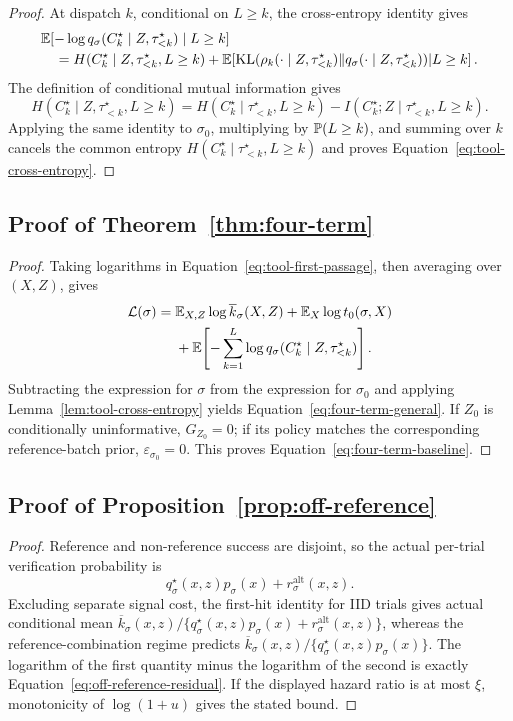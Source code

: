 \begin{proof}
At dispatch \(k\), conditional on \(L\ge k\), the cross-entropy identity gives
\begin{align*}
&\mathbb{E}[-\log q_\sigma(C_k^\star\mid Z,\tau_{<k}^\star)\mid L\ge k]\\
&\quad=H(C_k^\star\mid Z,\tau_{<k}^\star,L\ge k)
+\mathbb{E}\!\left[\operatorname{KL}\!\left(\rho_k(\cdot\mid Z,\tau_{<k}^\star)
\Vert q_\sigma(\cdot\mid Z,\tau_{<k}^\star)\right)\middle|L\ge k\right].
\end{align*}
The definition of conditional mutual information gives
\[
H(C_k^\star\mid Z,\tau_{<k}^\star,L\ge k)
=H(C_k^\star\mid \tau_{<k}^\star,L\ge k)
-I(C_k^\star;Z\mid \tau_{<k}^\star,L\ge k).
\]
Applying the same identity to \(\sigma_0\), multiplying by \(\mathbb{P}(L\ge k)\),
and summing over \(k\) cancels the common entropy
\(H(C_k^\star\mid \tau_{<k}^\star,L\ge k)\) and proves
Equation~\eqref{eq:tool-cross-entropy}.
\end{proof}

\subsection{Proof of Theorem~\ref{thm:four-term}}

\begin{proof}
Taking logarithms in Equation~\eqref{eq:tool-first-passage}, then averaging over
\((X,Z)\), gives
\begin{align*}
\mathcal L(\sigma)
={}&\mathbb{E}_{X,Z}\log\overline k_\sigma(X,Z)+\mathbb{E}_X\log t_0(\sigma,X)\\
&+\mathbb{E}\!\left[-\sum_{k=1}^{L}
\log q_\sigma(C_k^\star\mid Z,\tau_{<k}^\star)\right].
\end{align*}
Subtracting the expression for \(\sigma\) from the expression for \(\sigma_0\)
and applying Lemma~\ref{lem:tool-cross-entropy} yields
Equation~\eqref{eq:four-term-general}.  If \(Z_0\) is conditionally
uninformative, \(G_{Z_0}=0\); if its policy matches the corresponding
reference-batch prior, \(\varepsilon_{\sigma_0}=0\).  This proves
Equation~\eqref{eq:four-term-baseline}.
\end{proof}

\subsection{Proof of Proposition~\ref{prop:off-reference}}

\begin{proof}
Reference and non-reference success are disjoint, so the actual per-trial
verification probability is
\[
q_\sigma^\star(x,z)p_\sigma(x)+r_\sigma^{\mathrm{alt}}(x,z).
\]
Excluding separate signal cost, the first-hit identity for IID trials gives
actual conditional mean
\(\overline k_\sigma(x,z)/
\{q_\sigma^\star(x,z)p_\sigma(x)+r_\sigma^{\mathrm{alt}}(x,z)\}\),
whereas the reference-combination regime predicts
\(\overline k_\sigma(x,z)/\{q_\sigma^\star(x,z)p_\sigma(x)\}\).  The logarithm
of the first
quantity minus the logarithm of the second is exactly
Equation~\eqref{eq:off-reference-residual}.  If the displayed hazard ratio is
at most \(\xi\), monotonicity of \(\log(1+u)\) gives the stated bound.
\end{proof}
